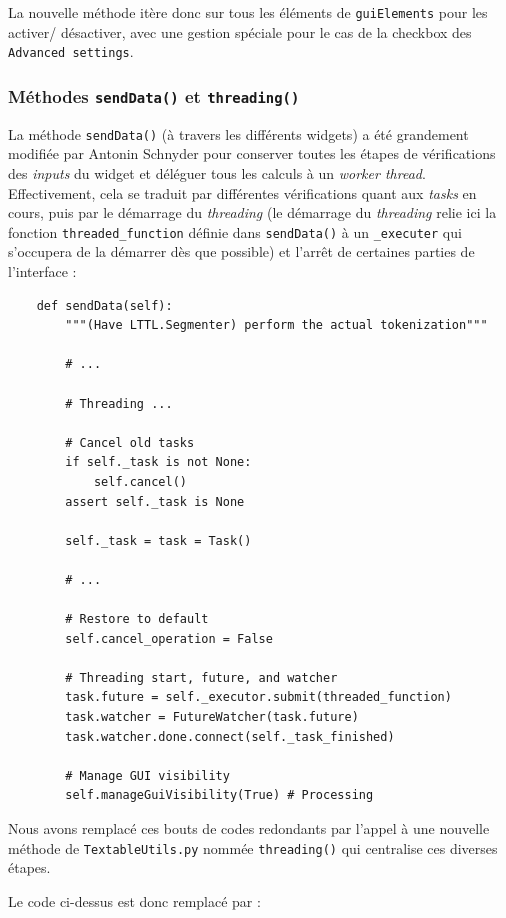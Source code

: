 \documentclass{article}
\begin{document}
La nouvelle méthode itère donc sur tous les éléments de \texttt{guiElements} pour les activer/ désactiver, avec une gestion spéciale pour le cas de la checkbox des \texttt{Advanced settings}.

\subsubsection{Méthodes \texttt{sendData()} et \texttt{threading()}}

La méthode \texttt{sendData()} (à travers les différents widgets) a été grandement modifiée par Antonin Schnyder pour conserver toutes les étapes de vérifications des \textit{inputs} du widget et déléguer tous les calculs à un \textit{worker thread}. Effectivement, cela se traduit par différentes vérifications quant aux \textit{tasks} en cours, puis par le démarrage du \textit{threading} (le démarrage du \textit{threading} relie ici la fonction \texttt{threaded\_function} définie dans \texttt{sendData()} à un \texttt{\_executer} qui s'occupera de la démarrer dès que possible) et l'arrêt de certaines parties de l'interface : 

\begin{verbatim}
    def sendData(self):
        """(Have LTTL.Segmenter) perform the actual tokenization"""

        # ...

        # Threading ...
        
        # Cancel old tasks
        if self._task is not None:
            self.cancel()
        assert self._task is None

        self._task = task = Task()
        
        # ...

        # Restore to default
        self.cancel_operation = False

        # Threading start, future, and watcher
        task.future = self._executor.submit(threaded_function)
        task.watcher = FutureWatcher(task.future)
        task.watcher.done.connect(self._task_finished)

        # Manage GUI visibility
        self.manageGuiVisibility(True) # Processing
\end{verbatim}

Nous avons remplacé ces bouts de codes redondants par l'appel à une nouvelle méthode de \texttt{TextableUtils.py} nommée \texttt{threading()} qui centralise ces diverses étapes.

\vspace{5mm}
Le code ci-dessus est donc remplacé par : 
\end{document}
